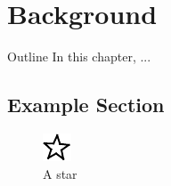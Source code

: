 \chapter{Background}\label{ch:background}

\begin{remark}{Outline}
In this chapter, ...
\end{remark}

\section{Example Section} 

\begin{figure}[h]
\centering
\includegraphics[scale=10]{figures/star}
\caption{A star}
\end{figure}

